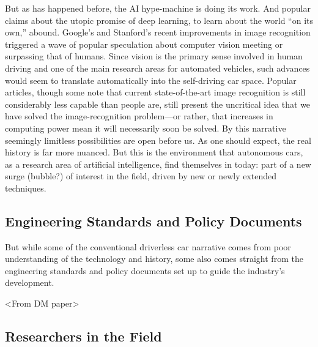 



But as has happened before, the AI hype-machine is doing its
work. And popular claims about the utopic promise of deep learning, to
learn about the world ``on its own,''
abound. Google's and Stanford's recent
improvements in image recognition\cite{markoffImage} triggered a wave
of popular speculation about computer vision meeting or surpassing
that of humans. Since vision is the primary sense involved in human driving
and one of the main research areas for automated vehicles, such
advances would seem to translate automatically into the self-driving
car space. Popular articles, though some note that current
state-of-the-art image recognition is still considerably less capable
than people are, still present the uncritical idea that we have solved
the image-recognition problem---or rather, that increases in computing
power mean it will necessarily soon be solved. By this narrative seemingly limitless
possibilities are open before us. As one should expect, the real
history is far more nuanced. But this is the environment that autonomous cars, as a
research area of artificial intelligence, find themselves in today:
part of a new surge (bubble?) of interest in the field, driven by new
or newly extended techniques.


\subsection{Engineering Standards and Policy Documents}

But while some of the conventional driverless car narrative comes from
poor understanding of the technology and history, some also comes
straight from the engineering standards and policy documents set up to
guide the industry's development.

<From DM paper>

\subsection{Researchers in the Field}




